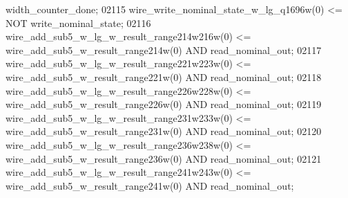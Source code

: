 \begin{DoxyCode}
{{      width_counter_done};
02115     \textcolor{vhdlchar}{wire_write_nominal_state_w_lg_q1696w}\textcolor{vhdlchar}{(}\textcolor{vhdllogic}{}\textcolor{vhdllogic}{0}\textcolor{vhdlchar}{)} \textcolor{vhdlchar}{<=} \textcolor{keywordflow}{NOT} \textcolor{vhdlchar}{write_nominal_state};
02116     \textcolor{vhdlchar}{wire_add_sub5_w_lg_w_result_range214w216w}\textcolor{vhdlchar}{(}\textcolor{vhdllogic}{}\textcolor{vhdllogic}{0}\textcolor{vhdlchar}{)} \textcolor{vhdlchar}{<=} \textcolor{vhdlchar}{
      wire_add_sub5_w_result_range214w}\textcolor{vhdlchar}{(}\textcolor{vhdllogic}{}\textcolor{vhdllogic}{0}\textcolor{vhdlchar}{)} \textcolor{keywordflow}{AND} \textcolor{vhdlchar}{read_nominal_out};
02117     \textcolor{vhdlchar}{wire_add_sub5_w_lg_w_result_range221w223w}\textcolor{vhdlchar}{(}\textcolor{vhdllogic}{}\textcolor{vhdllogic}{0}\textcolor{vhdlchar}{)} \textcolor{vhdlchar}{<=} \textcolor{vhdlchar}{
      wire_add_sub5_w_result_range221w}\textcolor{vhdlchar}{(}\textcolor{vhdllogic}{}\textcolor{vhdllogic}{0}\textcolor{vhdlchar}{)} \textcolor{keywordflow}{AND} \textcolor{vhdlchar}{read_nominal_out};
02118     \textcolor{vhdlchar}{wire_add_sub5_w_lg_w_result_range226w228w}\textcolor{vhdlchar}{(}\textcolor{vhdllogic}{}\textcolor{vhdllogic}{0}\textcolor{vhdlchar}{)} \textcolor{vhdlchar}{<=} \textcolor{vhdlchar}{
      wire_add_sub5_w_result_range226w}\textcolor{vhdlchar}{(}\textcolor{vhdllogic}{}\textcolor{vhdllogic}{0}\textcolor{vhdlchar}{)} \textcolor{keywordflow}{AND} \textcolor{vhdlchar}{read_nominal_out};
02119     \textcolor{vhdlchar}{wire_add_sub5_w_lg_w_result_range231w233w}\textcolor{vhdlchar}{(}\textcolor{vhdllogic}{}\textcolor{vhdllogic}{0}\textcolor{vhdlchar}{)} \textcolor{vhdlchar}{<=} \textcolor{vhdlchar}{
      wire_add_sub5_w_result_range231w}\textcolor{vhdlchar}{(}\textcolor{vhdllogic}{}\textcolor{vhdllogic}{0}\textcolor{vhdlchar}{)} \textcolor{keywordflow}{AND} \textcolor{vhdlchar}{read_nominal_out};
02120     \textcolor{vhdlchar}{wire_add_sub5_w_lg_w_result_range236w238w}\textcolor{vhdlchar}{(}\textcolor{vhdllogic}{}\textcolor{vhdllogic}{0}\textcolor{vhdlchar}{)} \textcolor{vhdlchar}{<=} \textcolor{vhdlchar}{
      wire_add_sub5_w_result_range236w}\textcolor{vhdlchar}{(}\textcolor{vhdllogic}{}\textcolor{vhdllogic}{0}\textcolor{vhdlchar}{)} \textcolor{keywordflow}{AND} \textcolor{vhdlchar}{read_nominal_out};
02121     \textcolor{vhdlchar}{wire_add_sub5_w_lg_w_result_range241w243w}\textcolor{vhdlchar}{(}\textcolor{vhdllogic}{}\textcolor{vhdllogic}{0}\textcolor{vhdlchar}{)} \textcolor{vhdlchar}{<=} \textcolor{vhdlchar}{
      wire_add_sub5_w_result_range241w}\textcolor{vhdlchar}{(}\textcolor{vhdllogic}{}\textcolor{vhdllogic}{0}\textcolor{vhdlchar}{)} \textcolor{keywordflow}{AND} \textcolor{vhdlchar}{read_nominal_out};
}
\end{DoxyCode}
